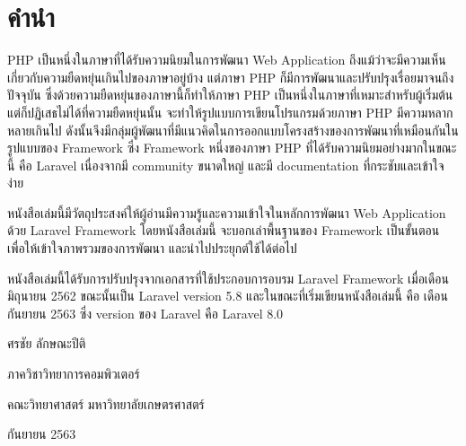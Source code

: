 \chapter*{คำนำ}

PHP เป็นหนึ่งในภาษาที่ได้รับความนิยมในการพัฒนา Web Application ถึงแม้ว่าจะมีความเห็นเกี่ยวกับความยืดหยุ่นเกินไปของภาษาอยู่บ้าง
แต่ภาษา PHP ก็มีการพัฒนาและปรับปรุงเรื่อยมาจนถึงปัจจุบัน ซึ่งด้วยความยืดหยุ่นของภาษานี้ก็ทำให้ภาษา PHP เป็นหนึ่งในภาษาที่เหมาะสำหรับผู้เริ่มต้น
แต่ก็ปฏิเสธไม่ได้ที่ความยืดหยุ่นนั้น จะทำให้รูปแบบการเขียนโปรแกรมด้วยภาษา PHP มีความหลากหลายเกินไป 
ดังนั้นจึงมีกลุ่มผู้พัฒนาที่มีแนวคิดในการออกแบบโครงสร้างของการพัฒนาที่เหมือนกันในรูปแบบของ Framework ซึ่ง Framework หนึ่งของภาษา PHP 
ที่ได้รับความนิยมอย่างมากในขณะนี้ คือ Laravel เนื่องจากมี community ขนาดใหญ่ และมี documentation ที่กระชับและเข้าใจง่าย

หนังสือเล่มนี้มีวัตถุประสงค์ให้ผู้อ่านมีความรู้และความเข้าใจในหลักการพัฒนา Web Application ด้วย Laravel Framework โดยหนังสือเล่มนี้
จะบอกเล่าพื้นฐานของ Framework เป็นขั้นตอน เพื่อให้เข้าใจภาพรวมของการพัฒนา และนำไปประยุกต์ใช้ได้ต่อไป

หนังสือเล่มนี้ได้รับการปรับปรุงจากเอกสารที่ใช้ประกอบการอบรม Laravel Framework เมื่อเดือนมิถุนายน 2562 ขณะนั้นเป็น Laravel version 5.8
และในขณะที่เริ่มเขียนหนังสือเล่มนี้ คือ เดือนกันยายน 2563 ซึ่ง version ของ Laravel คือ Laravel 8.0

\hspace*{\fill} ศรชัย ลักษณะปีติ

\hspace*{\fill} ภาควิชาวิทยาการคอมพิวเตอร์ 

\hspace*{\fill} คณะวิทยาศาสตร์ มหาวิทยาลัยเกษตรศาสตร์ 

\hspace*{\fill} กันยายน 2563